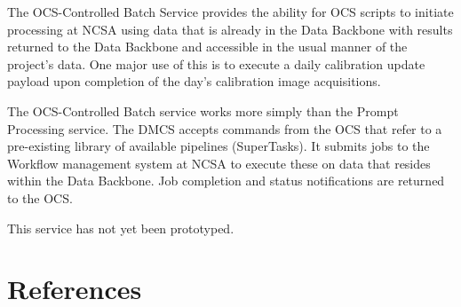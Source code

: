 \documentclass[DM,toc]{lsstdoc}
\begin{document}
The OCS-Controlled Batch Service provides the ability for OCS scripts to
initiate processing at NCSA using data that is already in the Data Backbone
with results returned to the Data Backbone and accessible in the usual manner
of the project’s data.  One major use of this is to execute a daily calibration
update payload upon completion of the day's calibration image acquisitions.

The OCS-Controlled Batch service works more simply than the Prompt Processing
service.  The DMCS accepts commands from the OCS that refer to a pre-existing
library of available pipelines (SuperTasks).  It submits jobs to the Workflow
management system at NCSA to execute these on data that resides within the Data
Backbone.  Job completion and status notifications are returned to the OCS.

This service has not yet been prototyped.

\section{References\label{references}}
\renewcommand{\refname}{}

\end{document}
